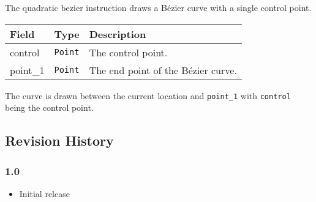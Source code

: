 \documentclass[]{article}
\providecommand{\tightlist}{%
  \setlength{\itemsep}{0pt}\setlength{\parskip}{0pt}}
\begin{document}
The quadratic bezier instruction draws a Bézier curve with a single
control point.

\begin{longtable}[]{@{}p{1in}p{0.5in}p{4.5in}@{}}
\toprule
Field & Type & Description \\
\midrule
\endhead
control & \texttt{Point} & The control point. \\
point\_1 & \texttt{Point} & The end point of the Bézier curve. \\
\bottomrule
\end{longtable}

The curve is drawn between the current location and \texttt{point\_1}
with \texttt{control} being the control point.

\hypertarget{revision-history}{%
\subsection{Revision History}\label{revision-history}}

\hypertarget{10}{%
\subsubsection{1.0}\label{10}}

\begin{itemize}
\tightlist
\item Initial release
\end{itemize}
\end{document}

